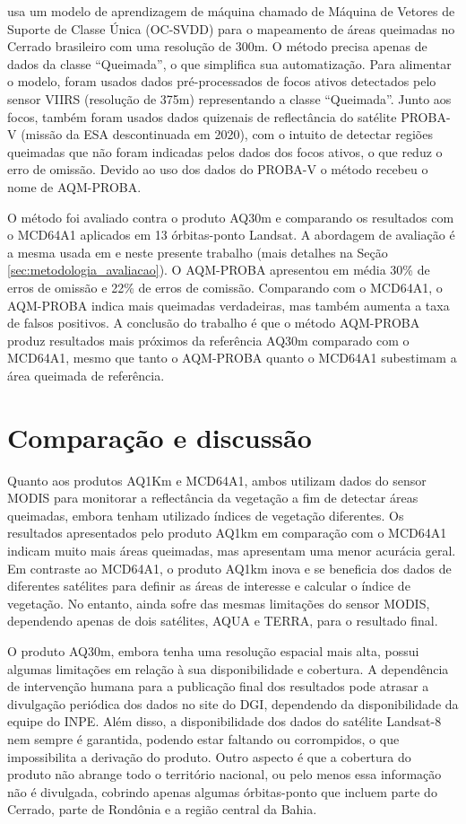 \documentclass[cic,tc]{iiufrgs}
\begin{document}
\citet{pereira2017burned} usa um modelo de aprendizagem de máquina chamado de Máquina de Vetores de Suporte de Classe Única (OC-SVDD) para o mapeamento de áreas queimadas no Cerrado brasileiro com uma resolução de 300m. O método precisa apenas de dados da classe ``Queimada'', o que simplifica sua automatização. Para alimentar o modelo, foram usados dados pré-processados de focos ativos detectados pelo sensor VIIRS (resolução de 375m) representando a classe ``Queimada''. Junto aos focos, também foram usados dados quizenais de reflectância do satélite PROBA-V (missão da ESA descontinuada em 2020), com o intuito de detectar regiões queimadas que não foram indicadas pelos dados dos focos ativos, o que reduz o erro de omissão. Devido ao uso dos dados do PROBA-V o método recebeu o nome de AQM-PROBA.

O método foi avaliado contra o produto AQ30m e comparando os resultados com o MCD64A1 aplicados em 13 órbitas-ponto Landsat. A abordagem de avaliação é a mesma usada em \citet{libonati2015algorithm} e neste presente trabalho (mais detalhes na Seção \ref{sec:metodologia_avaliacao}). O AQM-PROBA apresentou em média 30\% de erros de omissão e 22\% de erros de comissão. Comparando com o MCD64A1, o AQM-PROBA indica mais queimadas verdadeiras, mas também aumenta a taxa de falsos positivos. A conclusão do trabalho é que o método AQM-PROBA produz resultados mais próximos da referência AQ30m comparado com o MCD64A1, mesmo que tanto o AQM-PROBA quanto o MCD64A1 subestimam a área queimada de referência.

\section*{Comparação e discussão}

Quanto aos produtos AQ1Km e MCD64A1, ambos utilizam dados do sensor MODIS para monitorar a reflectância da vegetação a fim de detectar áreas queimadas, embora tenham utilizado índices de vegetação diferentes. Os resultados apresentados pelo produto AQ1km em comparação com o MCD64A1 indicam muito mais áreas queimadas, mas apresentam uma menor acurácia geral. Em contraste ao MCD64A1, o produto AQ1km inova e se beneficia dos dados de diferentes satélites para definir as áreas de interesse e calcular o índice de vegetação. No entanto, ainda sofre das mesmas limitações do sensor MODIS, dependendo apenas de dois satélites, AQUA e TERRA, para o resultado final.

O produto AQ30m, embora tenha uma resolução espacial mais alta, possui algumas limitações em relação à sua disponibilidade e cobertura. A dependência de intervenção humana para a publicação final dos resultados pode atrasar a divulgação periódica dos dados no site do DGI, dependendo da disponibilidade da equipe do INPE. Além disso, a disponibilidade dos dados do satélite Landsat-8 nem sempre é garantida, podendo estar faltando ou corrompidos, o que impossibilita a derivação do produto. Outro aspecto é que a cobertura do produto não abrange todo o território nacional, ou pelo menos essa informação não é divulgada, cobrindo apenas algumas órbitas-ponto que incluem parte do Cerrado, parte de Rondônia e a região central da Bahia.
\end{document}
